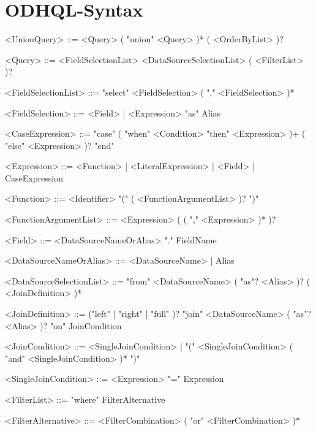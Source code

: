 \chapter{ODHQL-Syntax}\label{app:odhql-syntax}



\begin{grammar}
\small
    
    <UnionQuery> ::= <Query> ( "union" <Query> )* ( <OrderByList> )?

    <Query> ::= <FieldSelectionList>  <DataSourceSelectionList> ( <FilterList> )?

    <FieldSelectionList> ::= "select" <FieldSelection> ( "," <FieldSelection> )*

    <FieldSelection> ::= <Field> | <Expression> "as" Alias

    <CaseExpression> ::= "case" ( "when" <Condition> "then" <Expression> )+  ( "else" <Expression> )? "end"

    <Expression> ::= <Function> | <LiteralExpression> | <Field> | CaseExpression

    <Function> ::= <Identifier> "(" ( <FunctionArgumentList> )? ")"

    <FunctionArgumentList> ::= <Expression> ( ( "," <Expression> )* )?

    <Field> ::= <DataSourceNameOrAlias> "." FieldName

    <DataSourceNameOrAlias> ::= <DataSourceName> | Alias

    <DataSourceSelectionList> ::= "from" <DataSourceName> ( "as"? <Alias> )? ( <JoinDefinition> )*

    <JoinDefinition> ::= ("left" | "right" | "full" )? "join" <DataSourceName> ( "as"? <Alias> )? "on" JoinCondition

    <JoinCondition> ::= <SingleJoinCondition> | "(" <SingleJoinCondition> ( "and" <SingleJoinCondition> )* ")"

    <SingleJoinCondition> ::= <Expression> "=" Expression

    <FilterList> ::= "where" FilterAlternative

    <FilterAlternative> ::= <FilterCombination> ( "or" <FilterCombination> )*


\end{grammar}
